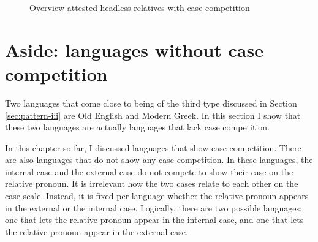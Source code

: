 \begin{figure}[H]
  \centering

    \caption{Overview attested headless relatives with case competition}
    \label{fig:attested-headless-relatives-case-competition}
\end{figure}




\section{Aside: languages without case competition}\label{sec:potentiel-counterexamples}

Two languages that come close to being of the third type discussed in Section \ref{sec:pattern-iii} are Old English and Modern Greek. In this section I show that these two languages are actually languages that lack case competition.

In this chapter so far, I discussed languages that show case competition. There are also languages that do not show any case competition. In these languages, the internal case and the external case do not compete to show their case on the relative pronoun. It is irrelevant how the two cases relate to each other on the case scale. Instead, it is fixed per language whether the relative pronoun appears in the external or the internal case. Logically, there are two possible languages: one that lets the relative pronoun appear in the internal case, and one that lets the relative pronoun appear in the external case.

